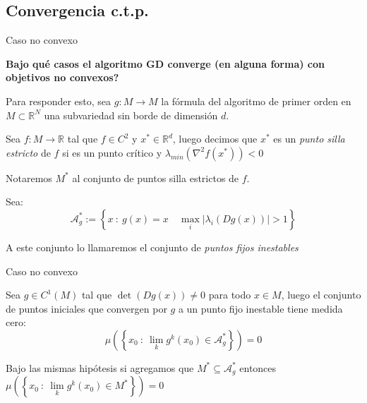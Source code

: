 \documentclass{beamer}
\newcommand{\puntosfijos}{\mathcal{A}_{g}^{*}}
\newcommand{\R}{{\mathbb{R}}}
\newcommand{\abs}[1]{\left\lvert#1\right\rvert}
\newcommand{\sett}[1]{\left\lbrace#1\right\rbrace}
\newcommand{\Biglim}[2]{\lim\limits_{#1}{#2}}
\begin{document}
\subsection{Convergencia c.t.p.}
\begin{frame}{Caso no convexo}

\textbf{{Bajo qu\'e casos el algoritmo GD converge (en alguna forma) con objetivos no convexos?}}

\pause

Para responder esto, sea $g : M  \rightarrow M$ la f\'ormula del algoritmo de primer orden en $M \subset \R^N$ una subvariedad sin borde de dimensi\'on $d$.

\begin{definition}
	Sea $f : M \rightarrow \R$ tal que $f \in C^2$ y $x^* \in \R^d$, luego decimos que $x^*$ es un \textit{punto silla estricto} de $f$ si es un punto cr\'itico y $\lambda_{min} \left(\nabla ^2 f(x^*)\right) < 0$ 
	
	Notaremos $M^*$ al conjunto de puntos silla estrictos de $f$.
	
\end{definition}

\pause

\begin{definition}
	Sea:
	\begin{equation*}
	\puntosfijos := \sett{x \ : \ g(x) = x \quad \max\limits_{i}\abs{\lambda_i \left(Dg(x)\right)} > 1}
	\end{equation*}
	
	A este conjunto lo llamaremos el conjunto de \textit{puntos fijos inestables}
\end{definition}

\end{frame}


\begin{frame}{Caso no convexo}

\begin{theorem}
	Sea $g \in C^1(M)$ tal que $\det\left(Dg(x)\right) \neq 0$ para todo $x \in M$, luego el conjunto de puntos iniciales que convergen por $g$ a un punto fijo inestable tiene medida cero:
	\begin{equation*}
	\mu \left(\sett{x_0 \ \colon \ \Biglim{k}{g^k(x_0) \in \mathcal{A}_g^{*}}}\right) = 0
	\end{equation*}
\end{theorem}

\pause

\begin{corollary}
	Bajo las mismas hip\'otesis si agregamos que $M^* \subseteq \mathcal{A}_g^{*}$ entonces $\mu\left(\sett{x_0 \ \colon \ \Biglim{k}{g^k(x_0) \in M^*}}\right) =0$
\end{corollary}

\end{frame}
\end{document}
